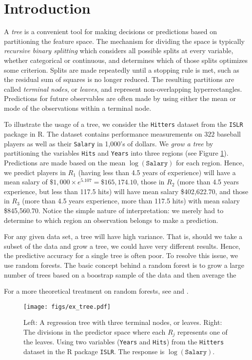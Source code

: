\section{Introduction} %

A \emph{tree} is a convenient tool for making decisions or predictions based on partitioning the feature space. The mechanism for dividing the space is typically \emph{recursive binary splitting} which considers all possible splits at every variable, whether categorical or continuous, and determines which of those splits optimizes some criterion. Splits are made repeatedly until a stopping rule is met, such as the residual sum of squares is no longer reduced. The resulting partitions are called \emph{terminal nodes}, or \emph{leaves}, and represent non-overlapping hyperrectangles. Predictions for future observables are often made by using either the mean or mode of the observations within a terminal node.

To illustrate the usage of a tree, we consider the \texttt{Hitters} dataset from the \texttt{ISLR} package in R. The dataset contains performance measurements on $322$ baseball players as well as their \texttt{Salary} in 1,000's of dollars. We \emph{grow a tree} by partitioning the variables \texttt{Hits} and \texttt{Years} into three regions (see Figure \ref{tree1}). Predictions are made based on the mean $\log(\mathtt{Salary})$ for each region. Hence, we predict players in $R_1$ (having less than 4.5 years of experience) will have a mean salary of $\$1,000\times e^{5.107}=\$165,174.10$, those in $R_2$ (more than 4.5 years experience, but less than 117.5 hits) will have mean salary \$402,622.70, and those in $R_3$ (more than 4.5 years experience, more than 117.5 hits) with mean salary \$845,560.70. Notice the simple nature of interpretation: we merely had to determine to which region an observation belongs to make a prediction.

For any given data set, a tree will have high variance. That is, should we take a subset of the data and grow a tree, we could have very different results. Hence, the predictive accuracy for a single tree is often poor. To resolve this issue, we use random forests. The basic concept behind a random forest is to grow a large number of trees based on a boostrap sample of the data and then average the 

For a more theoretical treatment on random forests, see \cite{breiman:2001} and \cite{segal:2011}.

\begin{figure}
\begin{center}
\texttt{[image: figs/ex\_tree.pdf]}
\caption{Left: A regression tree with three terminal nodes, or leaves. Right: The divisions in the predictor space where each $R_j$ represents one of the leaves. Using two variables (\texttt{Years} and \texttt{Hits}) from the \texttt{Hitters} dataset in the R package \texttt{ISLR}. The response is $\log(\mathtt{Salary})$.}
\label{tree1}
\end{center}
\end{figure}
